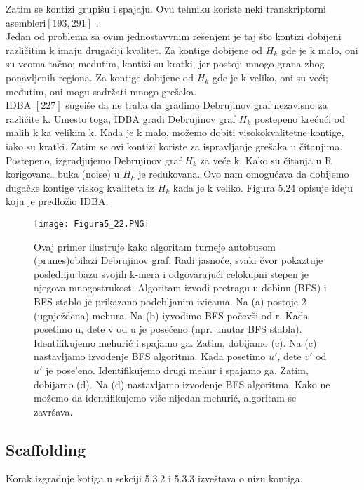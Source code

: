 \documentclass{article}
\begin{document}
Zatim se kontizi grupišu i spajaju. Ovu tehniku koriste neki transkriptorni asembleri$[193, 291]$ . \\

Jedan od problema sa ovim jednostavvnim rešenjem je taj što kontizi dobijeni različitim k imaju drugačiji kvalitet. Za kontige dobijene od $H_k$ gde je k malo, oni su veoma tačno; međutim, kontizi su kratki, jer postoji mnogo grana zbog ponavljenih regiona. Za kontige dobijene od $H_k$ gde je k veliko, oni su veći; međutim, oni mogu sadržati mnogo grešaka.\\

IDBA $[227]$ sugeiše da ne traba da gradimo Debrujinov graf nezavisno za različite k. Umesto toga, IDBA gradi Debrujinov graf $H_k$ postepeno krećući od malih k ka velikim k. Kada je k malo, možemo dobiti visokokvalitetne kontige, iako su kratki. Zatim se ovi kontizi koriste za ispravljanje grešaka u čitanjima. Postepeno, izgradjujemo Debrujinov graf $H_k$  za veće k. Kako su čitanja u R korigovana, buka (noise) u $H_k$ je redukovana. Ovo nam omogućava  da dobijemo dugačke kontige viskog kvaliteta iz $H_k$ kada je k veliko. Figura 5.24 opisuje ideju koju je predložio IDBA. \\

\begin{figure}[h]
\centering
\texttt{[image: Figura5\_22.PNG]}
\caption{Ovaj primer ilustruje kako algoritam turneje autobusom (prunes)obilazi Debrujinov graf. Radi jasnoće, svaki čvor pokaztuje poslednju bazu svojih k-mera i odgovarajući celokupni stepen je njegova mnogostrukost. Algoritam izvodi pretragu u dobinu (BFS) i BFS stablo je prikazano podebljanim ivicama. Na (a) postoje 2 (ugnježdena) mehura. Na (b) iyvodimo BFS počevši od r. Kada posetimo u, dete v od u je posećeno (npr. unutar BFS stabla). Identifikujemo mehurić i spajamo ga. Zatim, dobijamo (c). Na (c) nastavljamo izvođenje BFS algoritma. Kada posetimo $u'$, dete $v'$ od $u'$ je pose'eno. Identifikujemo drugi mehur i spajamo ga. Zatim, dobijamo (d). Na (d) nastavljamo izvođenje BFS algoritma. Kako ne možemo da identifikujemo više nijedan mehurić, algoritam se završava.}
\end{figure}



\subsection{Scaffolding}

Korak izgradnje kotiga u sekciji 5.3.2 i 5.3.3 izveštava o nizu kontiga. \\
\end{document}
